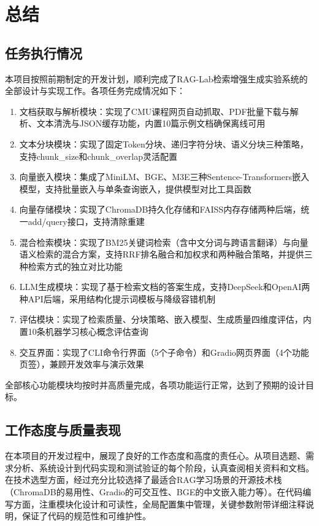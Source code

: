 \documentclass[10pt,a4paper]{article}
\begin{document}
\section{总结}

\subsection{任务执行情况}

本项目按照前期制定的开发计划，顺利完成了RAG-Lab检索增强生成实验系统的全部设计与实现工作。各项任务完成情况如下：

\begin{enumerate}[label=(\arabic*)]
\item 文档获取与解析模块：实现了CMU课程网页自动抓取、PDF批量下载与解析、文本清洗与JSON缓存功能，内置10篇示例文档确保离线可用
\item 文本分块模块：实现了固定Token分块、递归字符分块、语义分块三种策略，支持chunk\_size和chunk\_overlap灵活配置
\item 向量嵌入模块：集成了MiniLM、BGE、M3E三种Sentence-Transformers嵌入模型，支持批量嵌入与单条查询嵌入，提供模型对比工具函数
\item 向量存储模块：实现了ChromaDB持久化存储和FAISS内存存储两种后端，统一add/query接口，支持清除重建
\item 混合检索模块：实现了BM25关键词检索（含中文分词与跨语言翻译）与向量语义检索的混合方案，支持RRF排名融合和加权求和两种融合策略，并提供三种检索方式的独立对比功能
\item LLM生成模块：实现了基于检索文档的答案生成，支持DeepSeek和OpenAI两种API后端，采用结构化提示词模板与降级容错机制
\item 评估模块：实现了检索质量、分块策略、嵌入模型、生成质量四维度评估，内置10条机器学习核心概念评估查询
\item 交互界面：实现了CLI命令行界面（5个子命令）和Gradio网页界面（4个功能页签），兼顾开发效率与演示效果
\end{enumerate}

全部核心功能模块均按时并高质量完成，各项功能运行正常，达到了预期的设计目标。

\subsection{工作态度与质量表现}

在本项目的开发过程中，展现了良好的工作态度和高度的责任心。从项目选题、需求分析、系统设计到代码实现和测试验证的每个阶段，认真查阅相关资料和文档。在技术选型方面，经过充分比较选择了最适合RAG学习场景的开源技术栈（ChromaDB的易用性、Gradio的可交互性、BGE的中文嵌入能力等）。在代码编写方面，注重模块化设计和可读性，全局配置集中管理，关键参数附带详细注释说明，保证了代码的规范性和可维护性。
\end{document}

